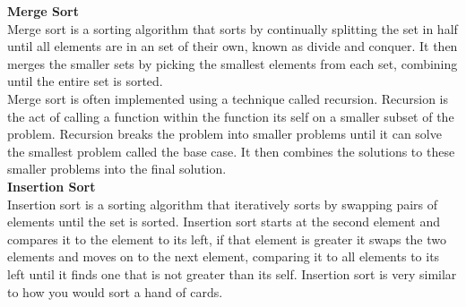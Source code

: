 \documentclass[a4paper]{article}
\begin{document}
    \textbf{Merge Sort}\\
    Merge sort is a sorting algorithm that sorts by continually splitting the set in 
    half until all elements are in an set of their own, known as divide and conquer.
    It then merges the smaller sets by picking the smallest elements from each set, 
    combining until the entire set is sorted.\\

    Merge sort is often implemented using a technique called recursion. Recursion is the act of calling a 
    function within the function its self on a smaller subset of the problem. 
    Recursion breaks the problem into smaller problems until it can solve the smallest 
    problem called the base case. It then combines the solutions to these smaller 
    problems into the final solution.\\


    \textbf{Insertion Sort}\\
    Insertion sort is a sorting algorithm that iteratively sorts by swapping pairs 
    of elements until the set is sorted. Insertion sort starts at the second element 
    and compares it to the element to its left, if that element is greater it swaps
    the two elements and moves on to the next element, comparing it to all elements
    to its left until it finds one that is not greater than its self. Insertion sort 
    is very similar to how you would sort a hand of cards.

    
\end{document}
